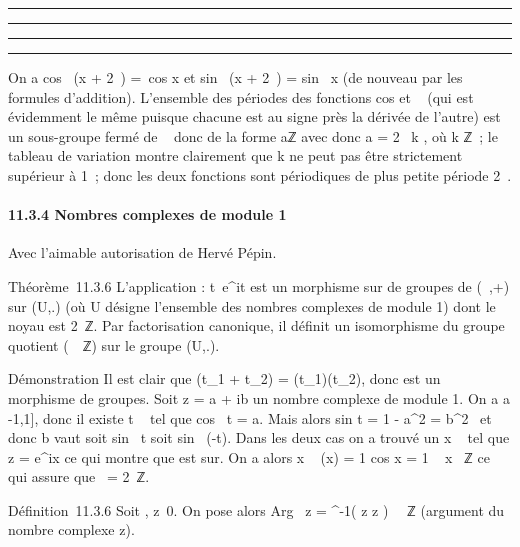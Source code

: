 \documentclass[]{article}
\begin{document}
\begin{center}\rule{3in}{0.4pt}\end{center}

\begin{center}\rule{3in}{0.4pt}\end{center}

\begin{center}\rule{3in}{0.4pt}\end{center}

\begin{center}\rule{3in}{0.4pt}\end{center}

On a cos~ (x + 2\pi~) =\
cos x et sin~ (x + 2\pi~)
= sin~ x (de nouveau par les formules
d'addition). L'ensemble des périodes des fonctions
cos et \sin~ (qui est
évidemment le même puisque chacune est au signe près la dérivée de
l'autre) est un sous-groupe fermé de \mathbb{R}~ donc de la forme aℤ avec donc a
= 2\pi~ \over k , où k \in ℤ~; le tableau de variation
montre clairement que k ne peut pas être strictement supérieur à 1~;
donc les deux fonctions sont périodiques de plus petite période 2\pi~.

\paragraph{11.3.4 Nombres complexes de module 1}

Avec l'aimable autorisation de Hervé Pépin.

Théorème~11.3.6 L'application \phi :
t\mapsto~e^it est un morphisme sur\jmathectif
de groupes de (~,+) sur (U,.) (où U désigne l'ensemble des nombres
complexes de module 1) dont le noyau est 2\pi~ℤ. Par factorisation
canonique, il définit un isomorphisme \overline\phi du
groupe quotient (~\pi~ℤ) sur le groupe (U,.).

Démonstration Il est clair que \phi(t\_1 + t\_2) =
\phi(t\_1)\phi(t\_2), donc \phi est un morphisme de groupes. Soit
z = a + ib un nombre complexe de module 1. On a a \in {[}-1,1{]}, donc il
existe t \in \mathbb{R}~ tel que cos~ t = a. Mais alors
sin t = 1 - a^2 = b^2~ et
donc b vaut soit sin~ t soit
sin~ (-t). Dans les deux cas on a trouvé un x \in
{}~ tel que z = e^ix ce qui montre que \phi est sur\jmathectif. On a
alors x \in\mathrmKer~\phi
\Leftrightarrow \phi(x) = 1 \mathrel\Leftrightarrow
cos x = 1 \mathrel\Leftrightarrow~ x \pi~ℤ
ce qui assure que
\mathrmKer~\phi = 2\pi~ℤ.

Définition~11.3.6 Soit \zeta \in {}, z\neq~0. On pose
alors Arg~ z =
\overline\phi^-1( z \over
\textbar{}z\textbar{} ) \in {}~\pi~ℤ (argument du nombre complexe z).
\end{document}

